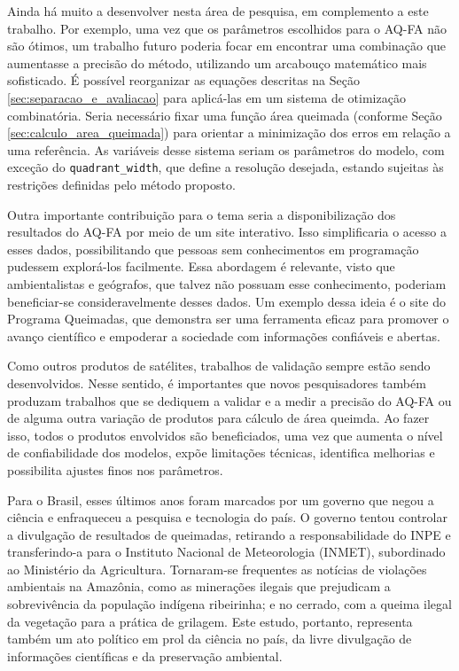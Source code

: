 \documentclass[cic,tc]{iiufrgs}
\begin{document}

Ainda há muito a desenvolver nesta área de pesquisa, em complemento a este trabalho. Por exemplo, uma vez que os parâmetros escolhidos para o AQ-FA não são ótimos, um trabalho futuro poderia focar em encontrar uma combinação que aumentasse a precisão do método, utilizando um arcabouço matemático mais sofisticado. É possível reorganizar as equações descritas na Seção \ref{sec:separacao_e_avaliacao} para aplicá-las em um sistema de otimização combinatória. Seria necessário fixar uma função área queimada (conforme Seção \ref{sec:calculo_area_queimada}) para orientar a minimização dos erros em relação a uma referência. As variáveis desse sistema seriam os parâmetros do modelo, com exceção do \texttt{quadrant\_width}, que define a resolução desejada, estando sujeitas às restrições definidas pelo método proposto.

Outra importante contribuição para o tema seria a disponibilização dos resultados do AQ-FA por meio de um site interativo. Isso simplificaria o acesso a esses dados, possibilitando que pessoas sem conhecimentos em programação pudessem explorá-los facilmente. Essa abordagem é relevante, visto que ambientalistas e geógrafos, que talvez não possuam esse conhecimento, poderiam beneficiar-se consideravelmente desses dados. Um exemplo dessa ideia é o site do Programa Queimadas, que demonstra ser uma ferramenta eficaz para promover o avanço científico e empoderar a sociedade com informações confiáveis e abertas. 

Como outros produtos de satélites, trabalhos de validação sempre estão sendo desenvolvidos. Nesse sentido, é importantes que novos pesquisadores também produzam trabalhos que se dediquem a validar e a medir a precisão do AQ-FA ou de alguma outra variação de produtos para cálculo de área queimda. Ao fazer isso, todos o produtos envolvidos são beneficiados, uma vez que aumenta o nível de confiabilidade dos modelos, expõe limitações técnicas, identifica melhorias e possibilita ajustes finos nos parâmetros.


Para o Brasil, esses últimos anos foram marcados por um governo que negou a ciência e enfraqueceu a pesquisa e tecnologia do país. O governo tentou controlar a divulgação de resultados de queimadas, retirando a responsabilidade do INPE e transferindo-a para o Instituto Nacional de Meteorologia (INMET), subordinado ao Ministério da Agricultura. Tornaram-se frequentes as notícias de violações ambientais na Amazônia, como as minerações ilegais que prejudicam a sobrevivência da população indígena ribeirinha; e no cerrado, com a queima ilegal da vegetação para a prática de grilagem. Este estudo, portanto, representa também um ato político em prol da ciência no país, da livre divulgação de informações científicas e da preservação ambiental.






\end{document}
